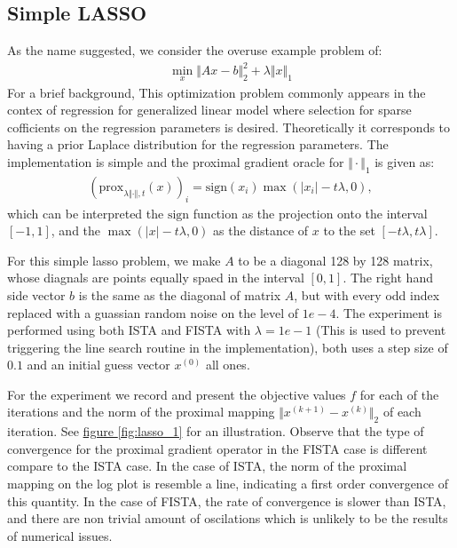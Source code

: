 \documentclass[]{article}
\theoremstyle{definition}
\begin{document}
    \subsection*{Simple LASSO}
        As the name suggested, we consider the overuse example problem of: 
        \begin{align*}
            \min_{x}\Vert Ax - b\Vert^2_2 + \lambda\Vert x\Vert_1
        \end{align*}
        For a brief background, This optimization problem commonly appears in the contex of regression for generalized linear model where selection for sparse cofficients on the regression parameters is desired. Theoretically it corresponds to having a prior Laplace distribution for the regression parameters. The implementation is simple and the proximal gradient oracle for $\Vert \cdot \Vert_1$ is given as: 
        \begin{align*}
           (\text{prox}_{\lambda\Vert \cdot \Vert, t}(x))_i
           = 
           \text{sign}(x_i)\max(|x_i| - t\lambda, 0), 
        \end{align*}
        which can be interpreted the $\text{sign}$ function as the projection onto the interval $[-1, 1]$, and the $\max(|x| - t\lambda, 0)$ as the distance of $x$ to the set $[-t\lambda, t\lambda]$. 
        \par
        For this simple lasso problem, we make $A$ to be a diagonal 128 by 128 matrix, whose diagnals are points equally spaed in the interval $[0, 1]$. The right hand side vector $b$ is the same as the diagonal of matrix $A$, but with every odd index replaced with a guassian random noise on the level of $1e-4$. The experiment is performed using both ISTA and FISTA with $\lambda = 1e-1$ (This is used to prevent triggering the line search routine in the implementation), both uses a step size of $0.1$ and an initial guess vector $x^{(0)}$ all ones. 
        \par
        For the experiment we record and present the objective values $f$ for each of the iterations and the norm of the proximal mapping $\Vert x^{(k + 1)} - x^{(k)}\Vert_2$ of each iteration. See \hyperref[fig:lasso_1]{figure \ref*{fig:lasso_1}} for an illustration. Observe that the type of convergence for the proximal gradient operator in the FISTA case is different compare to the ISTA case. In the case of ISTA, the norm of the proximal mapping on the log plot is resemble a line, indicating a first order convergence of this quantity. In the case of FISTA, the rate of convergence is slower than ISTA, and there are non trivial amount of oscilations which is unlikely to be the results of numerical issues.  
\end{document}
